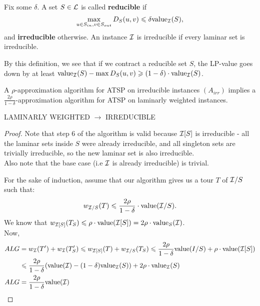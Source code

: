 \documentclass[./main.tex]{subfiles}
\begin{document}
	\begin{definition}
		Fix some $\delta$. A set $S\in \mathcal{L}$ is called \textbf{reducible} if
		\[
			\max_{u\in S_{in}, v\in S_{out}}D_S(u,v)\leqslant \delta \textup{value}_{\mathcal{I}}(S),
		\]
		and \textbf{irreducible} otherwise.
		An instance $\mathcal{I}$ is irreducible if every laminar set is irreducible.
	\end{definition}

	By this definition, we see that if we contract a reducible set $S$, the LP-value goes down by at least $\textup{value}_{\mathcal{I}}(S) - \max D_S(u,v)\geqslant(1-\delta)\cdot \textup{value}_{\mathcal{I}}(S)$.\\

	\begin{theorem}
		A $\rho$-approximation algorithm for ATSP on irreducible instances $(A_{irr})$ implies a $\frac{2\rho}{1-\delta}$-approximation algorithm for ATSP on laminarly weighted instances.
	\end{theorem}
	\begin{algorithm}\label{alg:1}
		\caption{LAMINARLY WEIGHTED $\rightarrow$ IRREDUCIBLE}
	\end{algorithm}
	\begin{proof}
		Note that step 6 of the algorithm is valid because $\mathcal{I}[S]$ is irreducible - all the laminar sets inside $S$ were already irreducible, and all singleton sets are trivially irreducible, so the new laminar set is also irreducible.\\
		Also note that the base case (i.e $\mathcal{I}$ is already irreducible) is trivial.

		For the sake of induction, assume that our algorithm gives us a tour $T$ of $\mathcal{I}/S$ such that:
		\[
			w_{\mathcal{I}/S}(T) \leqslant \frac{2\rho}{1-\delta}\cdot \textup{value}(\mathcal{I}/S).
		\]
		We know that $w_{\mathcal{I}[S]}(T_S)\leqslant \rho\cdot \textup{value}(\mathcal{I}[S]) = 2\rho\cdot\textup{value}_S(\mathcal{I})$.\\
		Now,
		\begin{align*}
				ALG &= w_{\mathcal{I}}(T') + w_{\mathcal{I}}(T_S') \leqslant w_{\mathcal{I}[S]}(T) + w_{\mathcal{I}/S}(T_S) \leqslant \frac{2\rho}{1-\delta}\textup{value}(I/S) + \rho\cdot \textup{value}(\mathcal{I}[S])\\
				&\leqslant \frac{2\rho}{1-\delta}(\textup{value}(\mathcal{I}) - (1-\delta) \textup{value}_{\mathcal{I}}(S)) + 2\rho\cdot\textup{value}_{\mathcal{I}}(S)\\
				ALG &= \frac{2\rho}{1-\delta} \textup{value}(\mathcal{I})
		\end{align*}
	\end{proof}
\end{document}
